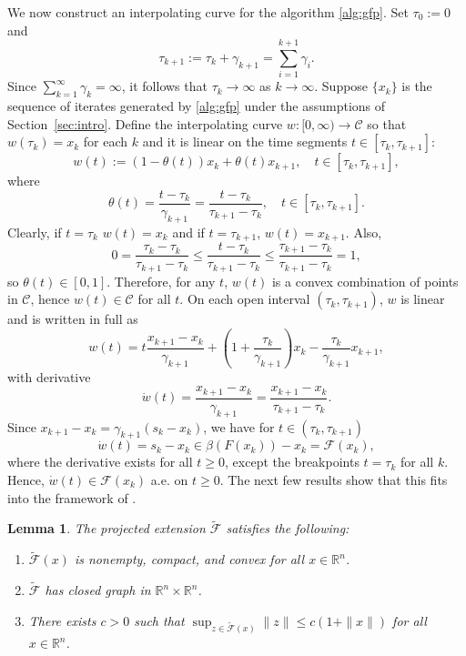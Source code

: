 \documentclass[pdflatex,sn-mathphys-num]{sn-jnl}%
\newcommand\R{\mathbb{R}}
\newcommand\C{\mathcal{C}}
\newcommand\mF{\mathcal{F}}
\newcommand\tmF{\widetilde{\mF}}
\newcommand\dw{\dot{w}}
\theoremstyle{thmstyleone}%
\newtheorem{lemma}[theorem]{Lemma}%
\theoremstyle{thmstyletwo}%
\theoremstyle{thmstylethree}%
\begin{document}
We now construct an interpolating curve for the algorithm \eqref{alg:gfp}. Set $\tau_0 := 0$ and
\[
  \tau_{k+1} := \tau_k + \gamma_{k+1} = \sum_{i=1}^{k+1}\gamma_i.
\]
Since $\sum_{k=1}^{\infty}\gamma_k = \infty$, it follows that $\tau_k \to \infty$ as $k \to \infty$. 
Suppose $\{x_k\}$ is the sequence of iterates generated by \eqref{alg:gfp} under the assumptions of Section~\ref{sec:intro}.
Define the interpolating curve $w : [0,\infty) \to \C$
so that $w(\tau_k) = x_k$ for each $k$ and it is linear on the time segments $t \in [\tau_k,\tau_{k+1}]$:
\[
  w(t) := (1-\theta(t))x_k + \theta(t)x_{k+1},\quad t \in [\tau_k,\tau_{k+1}],
\]
where
\[
  \theta(t) = \frac{t-\tau_k}{\gamma_{k+1}} = \frac{t - \tau_k}{\tau_{k+1} - \tau_k},\quad t \in [\tau_k,\tau_{k+1}].
\]
Clearly, if $t = \tau_k$ $w(t) = x_k$ and if $t = \tau_{k+1}$, $w(t) = x_{k+1}$. Also,
\[
 0 = \frac{\tau_k - \tau_k}{\tau_{k+1} - \tau_k} \leq \frac{t - \tau_k}{\tau_{k+1} - \tau_k} \leq \frac{\tau_{k+1} - \tau_k}{\tau_{k+1} - \tau_k} = 1,
\]
so $\theta(t) \in [0,1]$. Therefore, for any $t$, $w(t)$ is a convex combination of points in $\C$, hence $w(t) \in \C$ for all $t$.
On each open interval $(\tau_k,\tau_{k+1})$, $w$ is linear and is written in full as
\[
  w(t) = t\frac{x_{k+1} - x_k}{\gamma_{k+1}} + \left(1 + \frac{\tau_k}{\gamma_{k+1}}\right)x_k - \frac{\tau_k}{\gamma_{k+1}}x_{k+1},
\]
with derivative
\[
  \dw(t) = \frac{x_{k+1} - x_k}{\gamma_{k+1}} = \frac{x_{k+1} - x_k}{\tau_{k+1} - \tau_k}.
\]
Since $x_{k+1} - x_k = \gamma_{k+1}(s_k - x_k)$, we have for $t \in (\tau_k,\tau_{k+1})$
\[
  \dw(t) = s_k - x_k \in \beta(F(x_k)) - x_k = \mF(x_k),
\]
where the derivative exists for all $t \geq 0$, except the breakpoints $t = \tau_k$ for all $k$. Hence, $\dw(t) \in \mF(x_k)$ a.e. on $t \geq 0$.
The next few results show that this fits into the framework of \cite{Benaim2005}.

\begin{lemma}\label{lem:BHS-H1.1}
The projected extension $\tmF$ satisfies the following:
\begin{enumerate}
  \item[(a)] $\tmF(x)$ is nonempty, compact, and convex for all $x\in\R^n$.
  \item[(b)] $\tmF$ has closed graph in $\R^n\times\R^n$.
  \item[(c)] There exists $c>0$ such that $\sup_{z\in\tmF(x)}\|z\|\leq c(1+\|x\|)$ for all $x\in\R^n$.
\end{enumerate}
\end{lemma}
\end{document}
